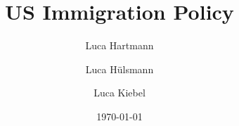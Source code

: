 \documentclass[10pt,a4paper,ngerman]{beamer}
\author{Luca Hartmann \and Luca Hülsmann \and Luca Kiebel}
\title{US Immigration Policy}
\date{\today}
\begin{document}
\begin{frame}
\titlepage
\end{frame}
\begin{frame}
\tableofcontents
\end{frame}
\end{document}

